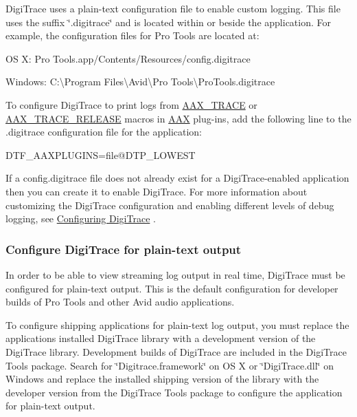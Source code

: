  Digi\+Trace uses a plain-\/text configuration file to enable custom logging. This file uses the suffix \char`\"{}.\+digitrace\char`\"{} and is located within or beside the application. For example, the configuration files for Pro Tools are located at\+:
\begin{DoxyItemize}
\item O\+S X\+: Pro Tools.\+app/\+Contents/\+Resources/config.digitrace
\item Windows\+: C\+:\textbackslash{}Program Files\textbackslash{}Avid\textbackslash{}Pro Tools\textbackslash{}Pro\+Tools.\+digitrace
\end{DoxyItemize}

 To configure Digi\+Trace to print logs from \hyperlink{a00158_ab53f1d6a94f8b6ebb3a101f71bfe4e82}{A\+A\+X\+\_\+\+T\+R\+A\+C\+E} or \hyperlink{a00158_ac2aa820ece56bb59140ad561218db4b3}{A\+A\+X\+\_\+\+T\+R\+A\+C\+E\+\_\+\+R\+E\+L\+E\+A\+S\+E} macros in \hyperlink{a00288}{A\+A\+X} plug-\/ins, add the following line to the .digitrace configuration file for the application\+:

 D\+T\+F\+\_\+\+A\+A\+X\+P\+L\+U\+G\+I\+N\+S=file@D\+T\+P\+\_\+\+L\+O\+W\+E\+S\+T 

 If a config.\+digitrace file does not already exist for a Digi\+Trace-\/enabled application then you can create it to enable Digi\+Trace. For more information about customizing the Digi\+Trace configuration and enabling different levels of debug logging, see \hyperlink{a00364_digitrace__configuring}{Configuring Digi\+Trace} .

\hypertarget{a00364_digitrace__gettingstarted__configurefordevelopment}{}\subsubsection{Configure Digi\+Trace for plain-\/text output}\label{a00364_digitrace__gettingstarted__configurefordevelopment}
 In order to be able to view streaming log output in real time, Digi\+Trace must be configured for plain-\/text output. This is the default configuration for developer builds of Pro Tools and other Avid audio applications.

 To configure shipping applications for plain-\/text log output, you must replace the application\textquotesingle{}s installed Digi\+Trace library with a development version of the Digi\+Trace library. Development builds of Digi\+Trace are included in the Digi\+Trace Tools package. Search for \char`\"{}\+Digitrace.\+framework\char`\"{} on O\+S X or \char`\"{}\+Digi\+Trace.\+dll\char`\"{} on Windows and replace the installed shipping version of the library with the developer version from the Digi\+Trace Tools package to configure the application for plain-\/text output.

